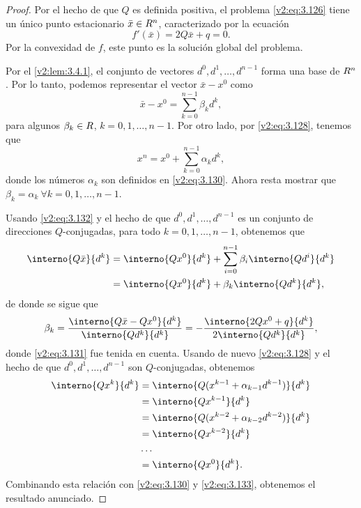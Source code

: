 \begin{proof}
    Por el hecho de que $Q$ es definida positiva, el problema \eqref{v2:eq:3.126} tiene un único punto estacionario $\bar{x} \in R^n$, caracterizado por la ecuación
    \begin{equation}
        f'(\bar{x}) = 2Q\bar{x} + q = 0.
        \label{v2:eq:3.131}
    \end{equation}
    Por la convexidad de $f$, este punto es la solución global del problema.
    
    Por el \cref{v2:lem:3.4.1}, el conjunto de vectores $d^0, d^1, \dots, d^{n-1}$ forma una base de $R^n$. Por lo tanto, podemos representar el vector $\bar{x} - x^0$ como
    \begin{equation}
        \bar{x} - x^0 = \sum_{k=0}^{n-1} \beta_k d^k,
        \label{v2:eq:3.132}
    \end{equation}
    para algunos $\beta_k \in R$, $k = 0, 1, \dots, n-1$. Por otro lado, por \eqref{v2:eq:3.128}, tenemos que
    \[
        x^n = x^0 + \sum_{k=0}^{n-1} \alpha_k d^k,
    \]
    donde los números $\alpha_k$ son definidos en \eqref{v2:eq:3.130}. Ahora resta mostrar que $\beta_k = \alpha_k \ \forall k = 0, 1, \dots, n-1$.
    
    Usando \eqref{v2:eq:3.132} y el hecho de que $d^0, d^1, \dots, d^{n-1}$ es un conjunto de direcciones $Q$-conjugadas, para todo $k = 0, 1, \dots, n-1$, obtenemos que
    \begin{align*}
        \interno{Q\bar{x}}{d^k} &= \interno{Qx^0}{d^k} + \sum_{i=0}^{n-1} \beta_i \interno{Qd^i}{d^k} \\
        &= \interno{Qx^0}{d^k} + \beta_k \interno{Qd^k}{d^k},
    \end{align*}
    de donde se sigue que
    \begin{equation}
        \beta_k = \frac{\interno{Q\bar{x} - Qx^0}{d^k}}{\interno{Qd^k}{d^k}} = - \frac{\interno{2Qx^0 + q}{d^k}}{2\interno{Qd^k}{d^k}},
        \label{v2:eq:3.133}
    \end{equation}
    donde \eqref{v2:eq:3.131} fue tenida en cuenta. Usando de nuevo \eqref{v2:eq:3.128} y el hecho de que $d^0, d^1, \dots, d^{n-1}$ son $Q$-conjugadas, obtenemos
    \begin{align*}
        \interno{Qx^k}{d^k} &= \interno{Q(x^{k-1} + \alpha_{k-1} d^{k-1})}{d^k} \\
        &= \interno{Qx^{k-1}}{d^k} \\
        &= \interno{Q(x^{k-2} + \alpha_{k-2} d^{k-2})}{d^k} \\
        &= \interno{Qx^{k-2}}{d^k} \\
        &\dots \\
        &= \interno{Qx^0}{d^k}.
    \end{align*}
    Combinando esta relación con \eqref{v2:eq:3.130} y \eqref{v2:eq:3.133}, obtenemos el resultado anunciado.
\end{proof}

